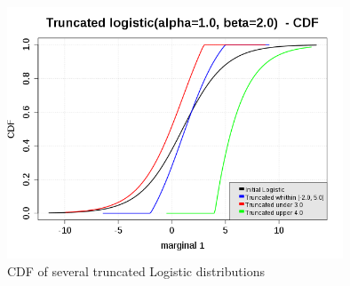 \begin{figure}[H]
  \begin{center}
    \includegraphics[width=10cm]{Figures/truncatedDistribution_cdf.png}
  \end{center}
  \caption{CDF of several truncated Logistic distributions}
  \label{truncatedDistribution_cdf}
\end{figure}

